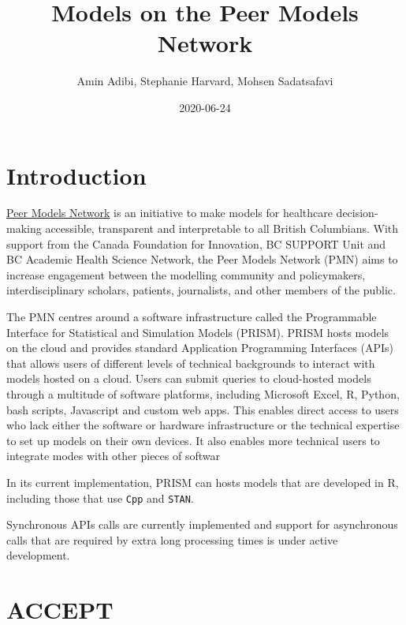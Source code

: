\documentclass[
]{book}
\title{Models on the Peer Models Network}
\author{Amin Adibi, Stephanie Harvard, Mohsen Sadatsafavi}
\date{2020-06-24}
\begin{document}
\maketitle

{
\setcounter{tocdepth}{1}
\tableofcontents
}
\hypertarget{introduction}{%
\chapter{Introduction}\label{introduction}}

\href{https://www.peermodelsnetwork.com/}{Peer Models Network} is an initiative to make models for healthcare decision-making accessible, transparent and interpretable to all British Columbians. With support from the Canada Foundation for Innovation, BC SUPPORT Unit and BC Academic Health Science Network, the Peer Models Network (PMN) aims to increase engagement between the modelling community and policymakers, interdisciplinary scholars, patients, journalists, and other members of the public.

The PMN centres around a software infrastructure called the Programmable Interface for Statistical and Simulation Models (PRISM). PRISM hosts models on the cloud and provides standard Application Programming Interfaces (APIs) that allows users of different levels of technical backgrounds to interact with models hosted on a cloud. Users can submit queries to cloud-hosted models through a multitude of software platforms, including Microsoft Excel, R, Python, bash scripts, Javascript and custom web apps. This enables direct access to users who lack either the software or hardware infrastructure or the technical expertise to set up models on their own devices. It also enables more technical users to integrate modes with other pieces of softwar

In its current implementation, PRISM can hosts models that are developed in R, including those that use \texttt{Cpp} and \texttt{STAN}.

Synchronous APIs calls are currently implemented and support for asynchronous calls that are required by extra long processing times is under active development.

\hypertarget{accept}{%
\chapter{ACCEPT}\label{accept}}
\end{document}
